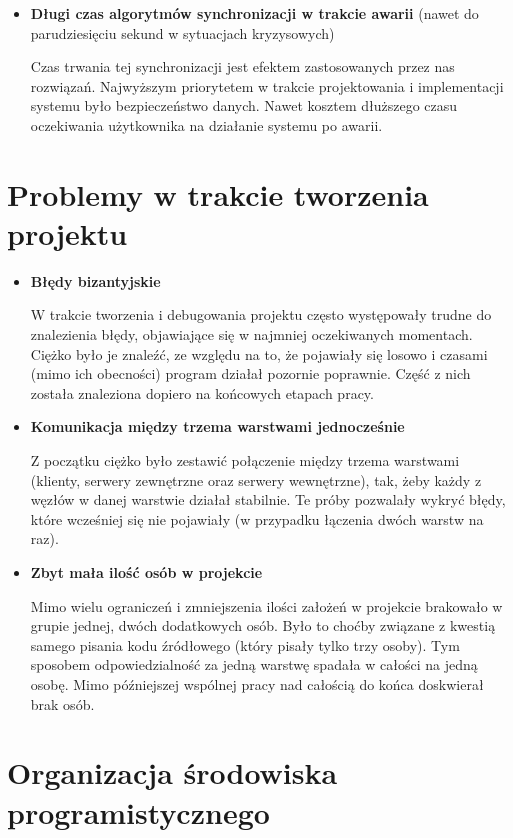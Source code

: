 {\begin{itemize}
\item \textbf{Długi czas algorytmów synchronizacji w trakcie awarii} (nawet do parudziesięciu sekund w sytuacjach kryzysowych)
\par{Czas trwania tej synchronizacji jest efektem zastosowanych przez nas rozwiązań. Najwyższym priorytetem w trakcie projektowania i implementacji systemu było bezpieczeństwo danych. Nawet kosztem dłuższego czasu oczekiwania użytkownika na działanie systemu po awarii.}

\end{itemize}

\section[Problemy w trakcie tworzenia projektu]{Problemy w trakcie tworzenia projektu}
\begin{itemize}
\item \textbf{Błędy bizantyjskie}
\par{W trakcie tworzenia i debugowania projektu często występowały trudne do znalezienia błędy, objawiające się w najmniej oczekiwanych momentach. Ciężko było je znaleźć, ze względu na to, że pojawiały się losowo i czasami (mimo ich obecności) program działał pozornie poprawnie. Część z nich została znaleziona dopiero na końcowych etapach pracy.}
\item \textbf{Komunikacja między trzema warstwami jednocześnie}
\par{Z początku ciężko było zestawić połączenie między trzema warstwami (klienty, serwery zewnętrzne oraz serwery wewnętrzne), tak, żeby każdy z węzłów w danej warstwie działał stabilnie. Te próby pozwalały wykryć błędy, które wcześniej się nie pojawiały (w przypadku łączenia dwóch warstw na raz).}
\item \textbf{Zbyt mała ilość osób w projekcie}
\par{Mimo wielu ograniczeń i zmniejszenia ilości założeń w projekcie brakowało w grupie jednej, dwóch dodatkowych osób. Było to choćby związane z kwestią samego pisania kodu źródłowego (który pisały tylko trzy osoby). Tym sposobem odpowiedzialność za jedną warstwę spadała w całości na jedną osobę. Mimo późniejszej wspólnej pracy nad całością do końca doskwierał brak osób.}
\end{itemize}

\section[Organizacja środowiska programistycznego]{Organizacja środowiska programistycznego}

}
